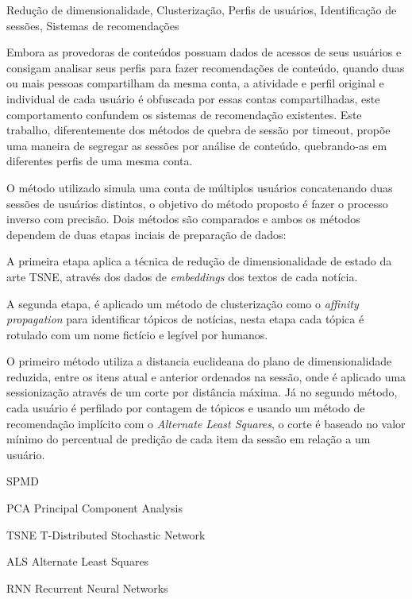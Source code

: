 \documentclass[ecp,tc,english]{iiufrgs}
\begin{document}
\begin{englishabstract}{}{Redução de dimensionalidade, Clusterização, Perfis de usuários, Identificação de sessões, Sistemas de recomendações}

  Embora as provedoras de conteúdos possuam dados de acessos de seus usuários e consigam analisar seus perfis para fazer recomendações de conteúdo, quando duas ou mais pessoas compartilham da mesma conta, a atividade e perfil original e individual de cada usuário é obfuscada por essas contas compartilhadas, este comportamento confundem os sistemas de recomendação existentes. Este trabalho, diferentemente dos métodos de quebra de sessão por timeout, propõe uma maneira de segregar as sessões por análise de conteúdo, quebrando-as em diferentes perfis de uma mesma conta.

  O método utilizado simula uma conta de múltiplos usuários concatenando duas sessões de usuários distintos, o objetivo do método proposto é fazer o processo inverso com precisão.
  Dois métodos são comparados e ambos os métodos dependem de duas etapas inciais de preparação de dados:
  
  A primeira etapa aplica a técnica de redução de dimensionalidade de estado da arte TSNE, através dos dados de \textit{embeddings} dos textos de cada notícia.
  
  A segunda etapa, é aplicado um método de clusterização como o  \textit{affinity propagation} para identificar tópicos de notícias, nesta etapa cada tópica é rotulado com um nome fictício e legível por humanos.
  
  O primeiro método utiliza a distancia euclideana do plano de dimensionalidade reduzida, entre os itens atual e anterior ordenados na sessão, onde é aplicado uma sessionização através de um corte por distância máxima. Já no segundo método, cada usuário é perfilado por contagem de tópicos e usando um método de recomendação implícito com o \textit{Alternate Least Squares}, o corte é baseado no valor mínimo do percentual de predição de cada item da sessão em relação a um usuário.
\cite{Jiang:2018:IUB:3209978.3210054}
\end{englishabstract}

\listoffigures 
\listoftables 

\begin{listofabbrv}{SPMD}
    \item[PCA] Principal Component Analysis
    \item[TSNE] T-Distributed Stochastic Network
    \item[ALS] Alternate Least Squares
    \item[RNN] Recurrent Neural Networks
\end{listofabbrv}
\end{document}

